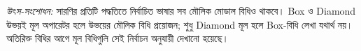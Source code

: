\documentclass[../../../include/open-logic-section]{subfiles}
\begin{document}
\emph{উৎস-সংশোধন:} সারণির প্রতিটি পদ্ধতিতে নির্বাচিত ভাষার সব মৌলিক মোডাল বিধিও থাকবে। Box ও Diamond উভয়ই মূল অপারেটর হলে উভয়ের মৌলিক বিধি প্রয়োজন; শুধু Diamond মূল হলে Box-বিধি লেখা যথার্থ নয়। অতিরিক্ত বিধির আগে মূল বিধিগুলি সেই নির্বাচন অনুযায়ী দেখানো হয়েছে।

\end{document}

